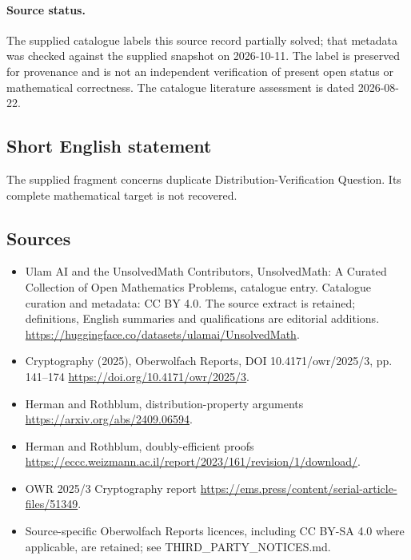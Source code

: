\documentclass[11pt]{article}
\begin{document}
\paragraph{Source status.}
The supplied catalogue labels this source record partially solved; that metadata was checked against the supplied snapshot on 2026-10-11. The label is preserved for provenance and is not an independent verification of present open status or mathematical correctness. The catalogue literature assessment is dated 2026-08-22.
\subsection{Short English statement}
The supplied fragment concerns duplicate Distribution-Verification Question. Its complete mathematical target is not recovered.
\subsection{Sources}
\begin{itemize}
\item[\hypertarget{source:statement:1}{S1}] Ulam AI and the UnsolvedMath Contributors, UnsolvedMath: A Curated Collection of Open Mathematics Problems, catalogue entry. Catalogue curation and metadata: CC BY 4.0. The source extract is retained; definitions, English summaries and qualifications are editorial additions.
\url{https://huggingface.co/datasets/ulamai/UnsolvedMath}.
\item[\hypertarget{source:statement:2}{S2}] Cryptography (2025), Oberwolfach Reports, DOI 10.4171/owr/2025/3, pp. 141--174
\url{https://doi.org/10.4171/owr/2025/3}.
\item[\hypertarget{source:statement:3}{S3}] Herman and Rothblum, distribution-property arguments
\url{https://arxiv.org/abs/2409.06594}.
\item[\hypertarget{source:statement:4}{S4}] Herman and Rothblum, doubly-efficient proofs
\url{https://eccc.weizmann.ac.il/report/2023/161/revision/1/download/}.
\item[\hypertarget{source:statement:5}{S5}] OWR 2025/3 Cryptography report
\url{https://ems.press/content/serial-article-files/51349}.
\item Source-specific Oberwolfach Reports licences, including CC BY-SA 4.0 where applicable, are retained; see THIRD\_PARTY\_NOTICES.md.
\end{itemize}
\end{document}
